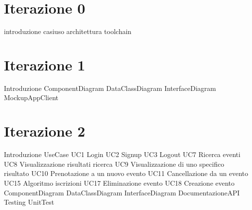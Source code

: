 \documentclass[a4paper, 12pt]{book}
\begin{document}

\tableofcontents
\listoffigures

\chapter{Iterazione 0}
{introduzione}
\clearpage
{casiuso}
\clearpage
{architettura}
\clearpage
{toolchain}
\clearpage

\chapter{Iterazione 1}
\clearpage
{Introduzione}
\clearpage
{ComponentDiagram}
\clearpage
{DataClassDiagram}
\clearpage
{InterfaceDiagram}
\clearpage
{MockupAppClient}
\clearpage

\chapter{Iterazione 2}
{Introduzione}
\clearpage
{UseCase}
\clearpage
{UC1 Login}
\clearpage
{UC2 Signup}
\clearpage
{UC3 Logout}
\clearpage
{UC7 Ricerca eventi}
\clearpage
{UC8 Visualizzazione risultati ricerca}
\clearpage
{UC9 Visualizzazione di uno specifico risultato}
\clearpage
{UC10 Prenotazione a un nuovo evento}
\clearpage
{UC11 Cancellazione da un evento}
\clearpage
{UC15 Algoritmo iscrizioni}
\clearpage
{UC17 Eliminazione evento}
\clearpage
{UC18 Creazione evento}
\clearpage
{ComponentDiagram}
\clearpage
{DataClassDiagram}
\clearpage
{InterfaceDiagram}
\clearpage
{DocumentazioneAPI}
\clearpage
{Testing}
\clearpage
{UnitTest}
\clearpage
\end{document}
